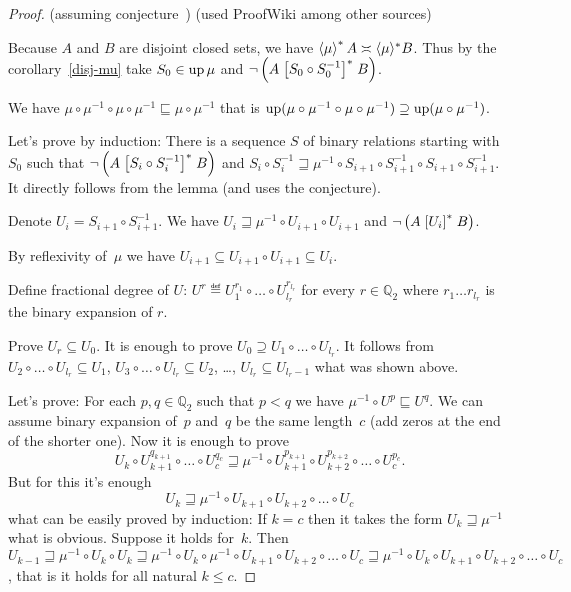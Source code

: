 \begin{proof}
(assuming conjecture~) (used ProofWiki among other sources)

Because $A$ and $B$ are disjoint closed sets, we
have $\left\langle \mu\right\rangle ^{\ast} A \asymp \langle \mu
\rangle^{\ast} B$. Thus by the corollary~\ref{disj-mu} take $S_0 \in \operatorname{up}
\mu$ and $\neg \left( A \mathrel{\left[S_0 \circ S_0^{- 1}\right]^{\ast}} B
\right)$.

We have $\mu \circ \mu^{- 1} \circ \mu \circ \mu^{- 1}
\sqsubseteq \mu \circ \mu^{- 1}$ that is $\operatorname{up} (\mu
\circ \mu^{- 1} \circ \mu \circ \mu^{- 1}) \supseteq
\operatorname{up} (\mu \circ \mu^{- 1})$.

Let's prove by induction: There is a sequence $S$ of binary relations starting
with $S_0$ such that $\neg \left( A \mathrel{\left[S_i \circ S_i^{- 1}\right]^{\ast}} B
\right)$ and $S_i \circ S_i^{- 1} \sqsupseteq \mu^{-1} \circ S_{i + 1} \circ S_{i + 1}^{- 1}
\circ S_{i + 1} \circ S_{i + 1}^{- 1}$. It directly follows from the lemma
(and uses the conjecture).

Denote $U_i = S_{i + 1} \circ S_{i + 1}^{- 1}$. We have $U_i \sqsupseteq \mu^{-1} \circ U_{i +
1} \circ U_{i + 1}$ and $\neg \left( A \mathrel{\left[U_i\right]^{\ast}} B \right)$.

By reflexivity of~$\mu$ we have $U_{i+1} \subseteq U_{i+1}\circ U_{i+1} \subseteq U_i$.

Define fractional degree of $U$: $U^r \eqdef U_1^{r_1} \circ
\ldots \circ U_{l_r}^{r_{l_r}}$ for every $r \in \mathbb{Q}_2$ where $r_1
\ldots r_{l_r}$ is the binary expansion of $r$.

Prove $U_r\subseteq U_0$. It is enough to prove
$U_0 \supseteq U_1 \circ \ldots \circ U_{l_r}$. It follows from $U_2 \circ
\ldots \circ U_{l_r} \subseteq U_1$, $U_3 \circ \ldots \circ U_{l_r} \subseteq
U_2$, \dots, $U_{l_r} \subseteq U_{l_r - 1}$ what was shown above.

Let's prove: For each $p,q\in\mathbb{Q}_2$ such that $p<q$ we have $\mu^{-1}\circ U^p\sqsubseteq U^q$.
We can assume binary expansion of~$p$ and~$q$ be the same length~$c$ (add zeros at the end of the shorter one).
Now it is enough to prove
\[ U_k\circ U_{k+1}^{q_{k+1}}\circ\dots\circ U_c^{q_c}\sqsupseteq\mu^{-1}\circ U_{k+1}^{p_{k+1}}\circ U_{k+2}^{p_{k+2}}\circ\dots\circ U_c^{p_c}. \]
But for this it's enough
\[ U_k\sqsupseteq\mu^{-1}\circ U_{k+1}\circ U_{k+2}\circ\dots\circ U_c \]
what can be easily proved by induction:
If $k=c$ then it takes the form $U_k\sqsupseteq\mu^{-1}$
what is obvious.
Suppose it holds for~$k$. Then $U_{k-1}\sqsupseteq\mu^{-1}\circ U_k\circ U_k\sqsupseteq
\mu^{-1}\circ U_k\circ \mu^{-1}\circ U_{k+1}\circ U_{k+2}\circ\dots\circ U_c\sqsupseteq
\mu^{-1}\circ U_k\circ U_{k+1}\circ U_{k+2}\circ\dots\circ U_c$, that is it holds
for all natural $k\leq c$.


\end{proof}
